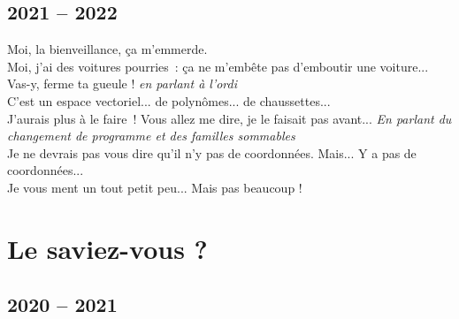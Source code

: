 \documentclass[french, a4paper, openany]{book}
\begin{document}
\section{2021 -- 2022}

	\noindent \og Moi, la bienveillance, ça m'emmerde. \fg \\
	\og Moi, j'ai des voitures pourries~: ça ne m'embête pas d'emboutir une voiture... \fg \\
	\og Vas-y, ferme ta gueule ! \fg \emph{en parlant à l'ordi} \\
	\og C'est un espace vectoriel... de polynômes... de chaussettes... \fg \\
	\og J'aurais plus à le faire~! Vous allez me dire, je le faisait pas avant... \fg \emph{En parlant du changement de programme et des familles sommables} \\
	\og Je ne devrais pas vous dire qu'il n'y pas de coordonnées. Mais... Y a pas de coordonnées... \fg \\
	\og Je vous ment un tout petit peu... Mais pas beaucoup ! \fg \\

\chapter{Le saviez-vous ?}

\section{2020 -- 2021}
\end{document}
